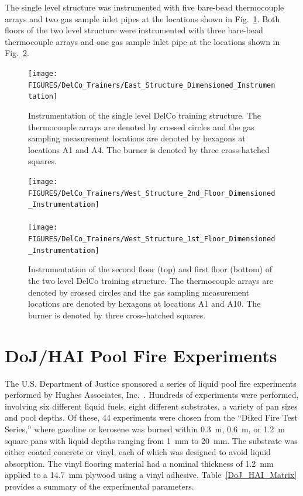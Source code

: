 The single level structure was instrumented with five bare-bead thermocouple arrays and two gas sample inlet pipes at the locations shown in Fig.~\ref{fig:east_instrumentation}. Both floors of the two level structure were instrumented with three bare-bead thermocouple arrays and one gas sample inlet pipe at the locations shown in Fig.~\ref{fig:west_instrumentation}.

\begin{figure}[!ht]
\texttt{[image: FIGURES/DelCo\_Trainers/East\_Structure\_Dimensioned\_Instrumentation]}
\caption[Instrumentation of the single level DelCo training structure]{Instrumentation of the single level DelCo training structure. The thermocouple arrays are denoted by crossed circles and the gas sampling measurement locations are denoted by hexagons at locations A1 and A4. The burner is denoted by three cross-hatched squares.}
\label{fig:east_instrumentation}
\end{figure}

\begin{figure}[p]
\texttt{[image: FIGURES/DelCo\_Trainers/West\_Structure\_2nd\_Floor\_Dimensioned\_Instrumentation]}
\\~\\
\texttt{[image: FIGURES/DelCo\_Trainers/West\_Structure\_1st\_Floor\_Dimensioned\_Instrumentation]}
\caption[Instrumentation of the two level DelCo training structure]{Instrumentation of the second floor (top) and first floor (bottom) of the two level DelCo training structure. The thermocouple arrays are denoted by crossed circles and the gas sampling measurement locations are denoted by hexagons at locations A1 and A10. The burner is denoted by three cross-hatched squares.}
\label{fig:west_instrumentation}
\end{figure}


\section{DoJ/HAI Pool Fire Experiments}
\label{DoJ_HAI_Pool_Fires_Description}

The U.S. Department of Justice sponsored a series of liquid pool fire experiments performed by Hughes Associates, Inc.~\cite{Mealy:DoJ_HAI_Pool_Fires}. Hundreds of experiments were performed, involving six different liquid fuels, eight different substrates, a variety of pan sizes and pool depths. Of these, 44 experiments were chosen from the ``Diked Fire Test Series,'' where gasoline or kerosene was burned within 0.3~m, 0.6~m, or 1.2~m square pans with liquid depths ranging from 1~mm to 20~mm. The substrate was either coated concrete or vinyl, each of which was designed to avoid liquid absorption. The vinyl flooring material had a nominal thickness of 1.2~mm applied to a 14.7~mm plywood using a vinyl adhesive. Table~\ref{DoJ_HAI_Matrix} provides a summary of the experimental parameters.

